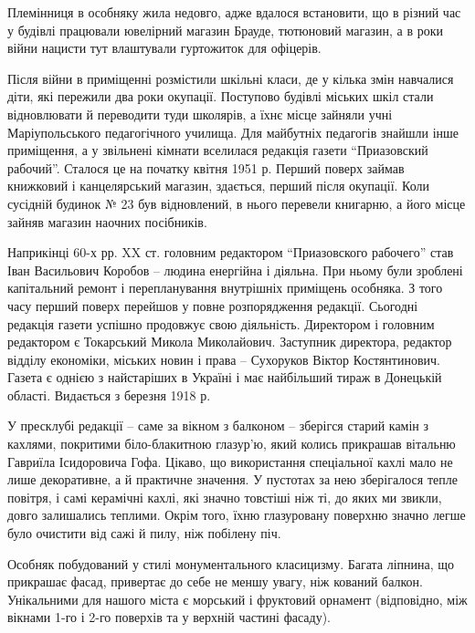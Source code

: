 Племінниця в особняку жила недовго, адже вдалося встановити, що в різний час у
будівлі працювали ювелірний магазин Брауде, тютюновий магазин, а в роки війни
нацисти тут влаштували гуртожиток для офіцерів.

Після війни в приміщенні розмістили шкільні класи, де у кілька змін навчалися
діти, які пережили два роки окупації. Поступово будівлі міських шкіл стали
відновлювати й переводити туди школярів, а їхнє місце зайняли учні
Маріупольського педагогічного училища. Для майбутніх педагогів знайшли інше
приміщення, а у звільнені кімнати вселилася редакція газети \enquote{Приазовский
рабочий}. Сталося це на початку квітня 1951 р. Перший поверх займав книжковий і
канцелярський магазин, здається, перший після окупації. Коли сусідній будинок №
23 був відновлений, в нього перевели книгарню, а його місце зайняв магазин
наочних посібників.

Наприкінці 60-х рр. ΧΧ ст. головним редактором \enquote{Приазовского рабочего} став
Іван Васильович Коробов – людина енергійна і діяльна. При ньому були зроблені
капітальний ремонт і перепланування внутрішніх приміщень особняка. З того часу
перший поверх перейшов у повне розпорядження редакції. Сьогодні редакція газети
успішно продовжує свою діяльність. Директором і головним редактором є
Токарський Микола Миколайович. Заступник директора, редактор відділу економіки,
міських новин і права – Сухоруков Віктор Костянтинович. Газета є однією з
найстаріших в Україні і має найбільший тираж в Донецькій області. Видається з
березня 1918 р.


У пресклубі редакції – саме за вікном з балконом – зберігся старий камін з
кахлями, покритими біло-блакитною глазур'ю, який колись прикрашав вітальню
Гавриїла Ісидоровича Гофа. Цікаво, що використання спеціальної кахлі мало не
лише декоративне, а й практичне значення. У пустотах за нею зберігалося тепле
повітря, і самі керамічні кахлі, які значно товстіші ніж ті, до яких ми звикли,
довго залишались теплими. Окрім того, їхню глазуровану поверхню значно легше
було очистити від сажі й пилу, ніж побілену піч.


Особняк побудований у стилі монументального класицизму. Багата ліпнина, що
прикрашає фасад, привертає до себе не меншу увагу, ніж кований балкон.
Унікальними для нашого міста є морський і фруктовий орнамент (відповідно, між
вікнами 1-го і 2-го поверхів та у верхній частині фасаду).

